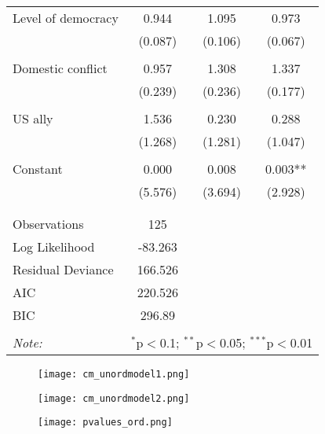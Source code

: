 \documentclass[12pt,letterpaper]{article}
\begin{document}
\begin{table}[H]
\begin{tabular}{@{\extracolsep{5pt}}lccc}
 Level of democracy & 0.944 & 1.095 & 0.973 \\ 
  & (0.087) & (0.106) & (0.067) \\ 
  & & & \\ 
 Domestic conflict & 0.957 & 1.308 & 1.337 \\ 
  & (0.239) & (0.236) & (0.177) \\ 
  & & & \\ 
 US ally & 1.536 & 0.230 & 0.288 \\ 
  & (1.268) & (1.281) & (1.047) \\ 
  & & & \\ 
 Constant & 0.000 & 0.008 & 0.003** \\ 
  & (5.576) & (3.694) & (2.928) \\ 
  & & & \\ 
\hline \\[-1.8ex] 
Observations & 125 \\
Log Likelihood & -83.263\\
Residual Deviance & 166.526\\
AIC & 220.526  \\ 
BIC & 296.89 \\
\hline 
\hline \\[-1.8ex] 
\textit{Note:}  & \multicolumn{3}{r}{$^{*}$p$<$0.1; $^{**}$p$<$0.05; $^{***}$p$<$0.01} \\ 
\end{tabular} 
\end{table}

 

\begin{figure}[H]
    \centering
    \texttt{[image: cm\_unordmodel1.png]}
\end{figure}

\begin{figure}[H]
    \centering
    \texttt{[image: cm\_unordmodel2.png]}
\end{figure}

 

\begin{figure}[H]
    \centering
    \texttt{[image: pvalues\_ord.png]}
\end{figure}

 
\end{document}

